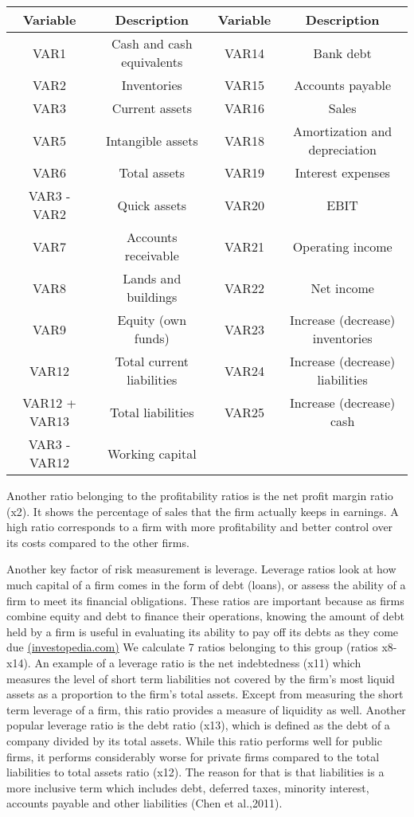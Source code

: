 \documentclass[11pt]{article}
\begin{document}
\begin{center}
\footnotesize
\begin{tabular}{cccc} 
\hline\hline
Variable  & Description & Variable & Description\\ 
\hline
VAR1 & Cash and cash equivalents & VAR14 & Bank debt\\
VAR2 & Inventories & VAR15 & Accounts payable\\
VAR3 & Current assets & VAR16 & Sales\\ 
VAR5 & Intangible assets & VAR18 & Amortization and depreciation\\
VAR6 & Total assets & VAR19 & Interest expenses\\
VAR3 - VAR2 & Quick assets & VAR20 & EBIT\\
VAR7 & Accounts receivable & VAR21 & Operating income\\
VAR8 & Lands and buildings & VAR22 & Net income\\
VAR9 & Equity (own funds) & VAR23 & Increase (decrease) inventories\\
VAR12 & Total current liabilities & VAR24 & Increase (decrease) liabilities\\
VAR12 + VAR13 & Total liabilities & VAR25 & Increase (decrease) cash\\
VAR3 - VAR12 & Working capital & &\\ 
\hline\hline
\end{tabular}
\end{center}
\vskip 0.2in
Another ratio belonging to the profitability ratios is the net profit margin ratio (x2). It shows the percentage of sales that the firm actually keeps in earnings. A high ratio corresponds to a firm with more profitability and better control over its costs compared to the other firms.  
 
 Another key factor of risk measurement is leverage. Leverage ratios look at how much capital of a firm comes in the form of debt (loans), or assess the ability of a firm to meet its financial obligations. These ratios are important because as firms combine equity and debt to finance their operations, knowing the amount of debt held by a firm is useful in evaluating its ability to pay off its debts as they come due \href{<https://www.investopedia.com/terms/l/leverageratio.asp>}{(investopedia.com)} We calculate 7 ratios belonging to this group (ratios x8-x14). An example of a leverage ratio is the net indebtedness (x11) which measures the level of short term liabilities not covered by the firm's most liquid assets as a proportion to the firm's total assets. Except from measuring the short term leverage of a firm, this ratio provides a measure of liquidity as well. Another popular leverage ratio is the debt ratio (x13), which is defined as the debt of a company divided by its total assets. While this ratio performs well for public firms, it performs  considerably worse for private firms compared to the total liabilities to total assets ratio (x12). The reason for that is that liabilities is a more inclusive term which includes debt, deferred taxes, minority interest, accounts payable and other liabilities (Chen et al.,2011).
 
\end{document}
